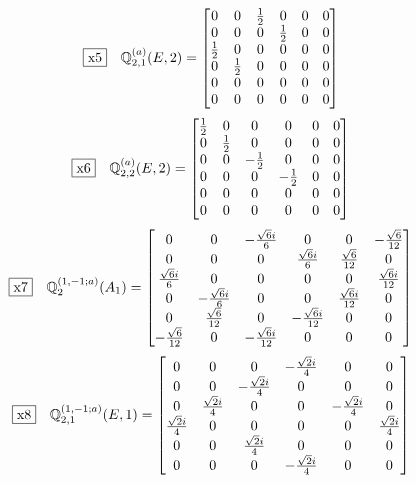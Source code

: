 \documentclass[fleqn,10pt,landscape]{jsarticle}
\begin{document}
\begin{dmath*}
\fbox{x5}\quad \mathbb{Q}_{2,1}^{(a)}(E,2)=\begin{bmatrix} 0 & 0 & \frac{1}{2} & 0 & 0 & 0 \\ 0 & 0 & 0 & \frac{1}{2} & 0 & 0 \\ \frac{1}{2} & 0 & 0 & 0 & 0 & 0 \\ 0 & \frac{1}{2} & 0 & 0 & 0 & 0 \\ 0 & 0 & 0 & 0 & 0 & 0 \\ 0 & 0 & 0 & 0 & 0 & 0 \end{bmatrix}
\end{dmath*}
\begin{dmath*}
\fbox{x6}\quad \mathbb{Q}_{2,2}^{(a)}(E,2)=\begin{bmatrix} \frac{1}{2} & 0 & 0 & 0 & 0 & 0 \\ 0 & \frac{1}{2} & 0 & 0 & 0 & 0 \\ 0 & 0 & - \frac{1}{2} & 0 & 0 & 0 \\ 0 & 0 & 0 & - \frac{1}{2} & 0 & 0 \\ 0 & 0 & 0 & 0 & 0 & 0 \\ 0 & 0 & 0 & 0 & 0 & 0 \end{bmatrix}
\end{dmath*}
\begin{dmath*}
\fbox{x7}\quad \mathbb{Q}_{2}^{(1,-1;a)}(A_{1})=\begin{bmatrix} 0 & 0 & - \frac{\sqrt{6} i}{6} & 0 & 0 & - \frac{\sqrt{6}}{12} \\ 0 & 0 & 0 & \frac{\sqrt{6} i}{6} & \frac{\sqrt{6}}{12} & 0 \\ \frac{\sqrt{6} i}{6} & 0 & 0 & 0 & 0 & \frac{\sqrt{6} i}{12} \\ 0 & - \frac{\sqrt{6} i}{6} & 0 & 0 & \frac{\sqrt{6} i}{12} & 0 \\ 0 & \frac{\sqrt{6}}{12} & 0 & - \frac{\sqrt{6} i}{12} & 0 & 0 \\ - \frac{\sqrt{6}}{12} & 0 & - \frac{\sqrt{6} i}{12} & 0 & 0 & 0 \end{bmatrix}
\end{dmath*}
\begin{dmath*}
\fbox{x8}\quad \mathbb{Q}_{2,1}^{(1,-1;a)}(E,1)=\begin{bmatrix} 0 & 0 & 0 & - \frac{\sqrt{2} i}{4} & 0 & 0 \\ 0 & 0 & - \frac{\sqrt{2} i}{4} & 0 & 0 & 0 \\ 0 & \frac{\sqrt{2} i}{4} & 0 & 0 & - \frac{\sqrt{2} i}{4} & 0 \\ \frac{\sqrt{2} i}{4} & 0 & 0 & 0 & 0 & \frac{\sqrt{2} i}{4} \\ 0 & 0 & \frac{\sqrt{2} i}{4} & 0 & 0 & 0 \\ 0 & 0 & 0 & - \frac{\sqrt{2} i}{4} & 0 & 0 \end{bmatrix}
\end{dmath*}
\end{document}
